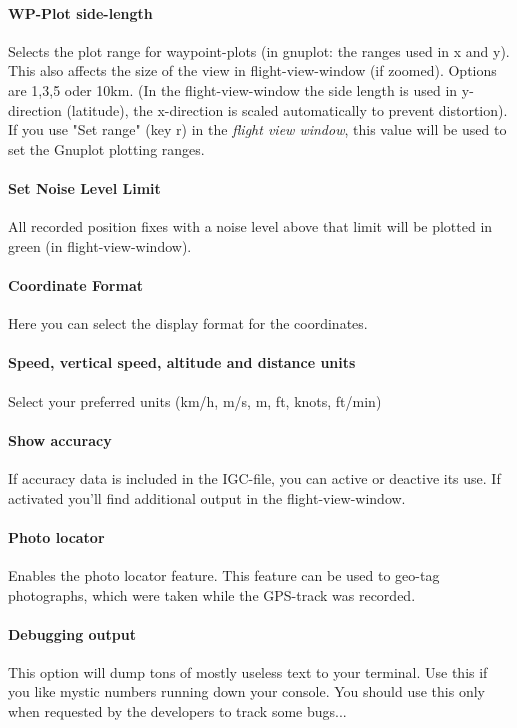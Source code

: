 \paragraph{WP-Plot side-length}
Selects the plot range for waypoint-plots (in gnuplot: the ranges used in x and y).
This also affects the size of the view in flight-view-window (if zoomed).
Options are 1,3,5 oder 10km. (In the flight-view-window the side length
is used in y-direction (latitude), the x-direction is scaled automatically to
prevent distortion).
If you use "Set range" (key r) in the \emph{flight view window}, this value will be used to set the
Gnuplot plotting ranges.

\paragraph{Set Noise Level Limit}
All recorded position fixes with a noise level above that limit will be
plotted in green (in flight-view-window).

\paragraph{Coordinate Format}
Here you can select the display format for the coordinates.

\paragraph{Speed, vertical speed, altitude and distance units}
Select your preferred units (km/h, m/s, m, ft, knots, ft/min)

\paragraph{Show accuracy}
If accuracy data is included in the IGC-file, you can active or deactive its use.
If activated you'll find additional output in the flight-view-window.

\paragraph{Photo locator}
Enables the photo locator feature. This feature can be used to geo-tag photographs, which were taken while the GPS-track was recorded.

\paragraph{Debugging output}
This option will dump tons of mostly useless text to your terminal. Use this if you like mystic numbers running down
your console. You should use this only when requested by the developers to track some bugs...

